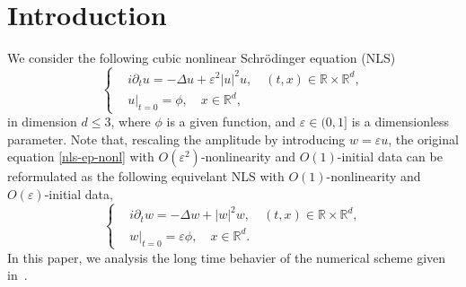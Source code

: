 \documentclass[10pt,a4paper]{article}
\begin{document}
  \section{Introduction}
  We consider the following cubic nonlinear Schr\"{o}dinger equation (NLS)
  \begin{equation}\label{nls-ep-nonl} %
    \left\{
    \begin{aligned}
      & i\partial_t u = -\Delta u + \varepsilon^2 |u|^2 u, \quad (t,x) \in
      \mathbb R\times\mathbb R^d, \\
      & u|_{t=0} = \phi, \quad x \in \mathbb R^d,
    \end{aligned}
    \right.
  \end{equation}
  in dimension \( d \leq 3 \), where \(\phi\) is a given function, and \(
  \varepsilon \in (0,1] \) is a dimensionless parameter.%
  Note that, rescaling the amplitude by introducing \(w = \varepsilon u\),
  the original equation \eqref{nls-ep-nonl} with \(O(\varepsilon^2)\)-nonlinearity and 
  \(O(1)\)-initial data can be reformulated as the following equivelant NLS
  with \(O(1)\)-nonlinearity and \(O(\varepsilon)\)-initial data,
  \begin{equation}%
    \left\{
    \begin{aligned}
      & i\partial_t w = -\Delta w + |w|^2 w, \quad (t,x) \in
      \mathbb R\times\mathbb R^d, \\
      & w|_{t=0} = \varepsilon \phi, \quad x \in \mathbb R^d.
    \end{aligned}
    \right.
  \end{equation}
  In this paper, we analysis the long time behavier of the numerical scheme
  given in~\cite{ORS21}.
\end{document}

